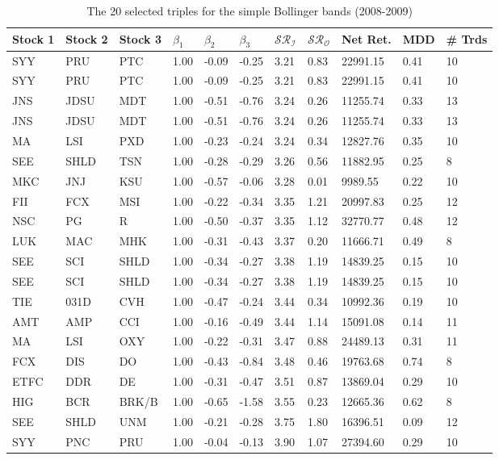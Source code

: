 \documentclass[11pt,a4,twosided,singlespacing,titlepagenumber=on]{scrreprt}
\numberwithin{equation}{chapter} %
\theoremstyle{remark}
\begin{document}
\renewcommand{\arraystretch}{0.8}%
\begin{table}[H]
\centering
\begin{tabular}{lllllllllll}
\hline
Stock 1 & Stock 2 & Stock 3 & $\beta_1$ & $\beta_2$ & $\beta_3$ & $\mathcal{SR}_\mathcal{I}$ & $\mathcal{SR}_\mathcal{O}$ & Net Ret. & MDD & \# Trds\\ \hline
SYY  & PRU  & PTC  & 1.00 & -0.09 & -0.25 & 3.21 & 0.83 & 22991.15 & 0.41 & 10 \\
SYY  & PRU  & PTC  & 1.00 & -0.09 & -0.25 & 3.21 & 0.83 & 22991.15 & 0.41 & 10 \\
JNS  & JDSU  & MDT  & 1.00 & -0.51 & -0.76 & 3.24 & 0.26 & 11255.74 & 0.33 & 13 \\
JNS  & JDSU  & MDT  & 1.00 & -0.51 & -0.76 & 3.24 & 0.26 & 11255.74 & 0.33 & 13 \\
MA  & LSI  & PXD  & 1.00 & -0.23 & -0.24 & 3.24 & 0.34 & 12827.76 & 0.35 & 10 \\
SEE  & SHLD  & TSN  & 1.00 & -0.28 & -0.29 & 3.26 & 0.56 & 11882.95 & 0.25 & 8 \\
MKC  & JNJ  & KSU  & 1.00 & -0.57 & -0.06 & 3.28 & 0.01 & 9989.55 & 0.22 & 10 \\
FII  & FCX  & MSI  & 1.00 & -0.22 & -0.34 & 3.35 & 1.21 & 20997.83 & 0.25 & 12 \\
NSC  & PG  & R  & 1.00 & -0.50 & -0.37 & 3.35 & 1.12 & 32770.77 & 0.48 & 12 \\
LUK  & MAC  & MHK  & 1.00 & -0.31 & -0.43 & 3.37 & 0.20 & 11666.71 & 0.49 & 8 \\
SEE  & SCI  & SHLD  & 1.00 & -0.34 & -0.27 & 3.38 & 1.19 & 14839.25 & 0.15 & 10 \\
SEE  & SCI  & SHLD  & 1.00 & -0.34 & -0.27 & 3.38 & 1.19 & 14839.25 & 0.15 & 10 \\
TIE  & 031D  & CVH  & 1.00 & -0.47 & -0.24 & 3.44 & 0.34 & 10992.36 & 0.19 & 10 \\
AMT  & AMP  & CCI  & 1.00 & -0.16 & -0.49 & 3.44 & 1.14 & 15091.08 & 0.14 & 11 \\
MA  & LSI  & OXY  & 1.00 & -0.22 & -0.31 & 3.47 & 0.88 & 24489.13 & 0.31 & 11 \\
FCX  & DIS  & DO  & 1.00 & -0.43 & -0.84 & 3.48 & 0.46 & 19763.68 & 0.74 & 8 \\
ETFC  & DDR  & DE  & 1.00 & -0.31 & -0.47 & 3.51 & 0.87 & 13869.04 & 0.29 & 10 \\
HIG  & BCR  & BRK/B  & 1.00 & -0.65 & -1.58 & 3.55 & 0.23 & 12665.36 & 0.62 & 8 \\
SEE  & SHLD  & UNM  & 1.00 & -0.21 & -0.28 & 3.75 & 1.80 & 16396.51 & 0.09 & 12 \\
SYY  & PNC  & PRU  & 1.00 & -0.04 & -0.13 & 3.90 & 1.07 & 27394.60 & 0.29 & 10 \\
\hline
\end{tabular}
\caption{The 20 selected triples for the simple Bollinger bands (2008-2009)}
\label{20_selected_triples_simple_bands}
\end{table}
\end{document}
